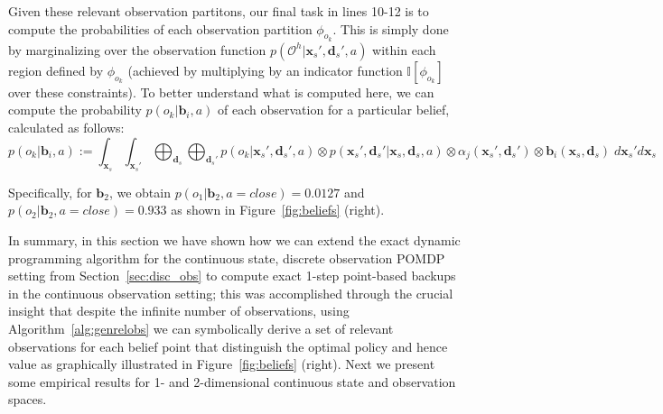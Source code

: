 \documentclass{article} %
\renewcommand{\vec}[1]{\mathbf{#1}} %
\newcommand{\xds}{\mathbf{x}_s,\!\mathbf{d}_s}
\newcommand{\xdsp}{\mathbf{x}_s',\!\mathbf{d}_s'}
\newcommand{\close}{\mathit{close}}
\begin{document}
Given these relevant observation partitons, our final task in lines
10-12 is to compute the probabilities of each observation partition
$\phi_{o_k}$.  This is simply done by marginalizing over the
observation function $p(\mathcal{O}^h|\xdsp,a)$ within each region
defined by $\phi_{o_k}$ (achieved by multiplying by an indicator
function $\mathbb{I}[\phi_{o_k}]$ over these constraints).  To better understand 
what is computed here, we can compute
the probability $p(o_k|\vec{b}_i,a)$ of each observation for a 
particular belief, calculated as follows:
{\footnotesize
\vspace{-1mm}
\begin{equation}
p(o_k|\vec{b}_i,a) := \int_{\vec{x}_{s}} \int_{\vec{x}_s'} \bigoplus_{\vec{d}_s} \bigoplus_{\vec{d}_s'} p(o_k|\xdsp,a) \otimes p(\xdsp| \xds,a) \otimes \alpha_j(\xdsp) \otimes \vec{b}_i(\xds)\; d\vec{x}_s' d\vec{x}_s
\end{equation}
\vspace{-4mm}
}

Specifically, for $\vec{b}_2$, we obtain $p(o_1|\vec{b}_2,a=\close) =
0.0127$ and $p(o_2|\vec{b}_2,a=\close) = 0.933$ as shown in
Figure~\ref{fig:beliefs} (right).

In summary, in this section we have shown how we can extend the exact
dynamic programming algorithm for the continuous state, discrete
observation POMDP setting from Section~\ref{sec:disc_obs} to compute
exact 1-step point-based backups in the continuous observation setting;
this was accomplished through the crucial insight that despite the
infinite number of observations, using Algorithm~\ref{alg:genrelobs}
we can symbolically 
derive a set of relevant observations for each belief point that
distinguish the optimal policy and hence value as graphically
illustrated in Figure~\ref{fig:beliefs} (right).  Next we present some
empirical results for 1- and 2-dimensional continuous state and 
observation spaces.

\end{document}
